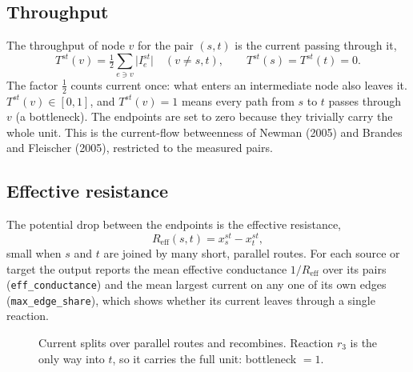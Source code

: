 \documentclass[11pt]{article}
\newcommand{\code}[1]{\texttt{#1}}
\newcommand{\Reff}{R_{\mathrm{eff}}}
\begin{document}
\subsection{Throughput}
The throughput of node $v$ for the pair $(s,t)$ is the current passing through it,
\begin{equation}
  T^{st}(v) = \tfrac12 \sum_{e\ni v} \bigl|I^{st}_e\bigr|
  \quad (v\neq s,t),
  \qquad T^{st}(s)=T^{st}(t)=0 .
  \label{eq:throughput}
\end{equation}
The factor $\tfrac12$ counts current once: what enters an intermediate node also
leaves it. $T^{st}(v)\in[0,1]$, and $T^{st}(v)=1$ means every path from $s$ to $t$
passes through $v$ (a bottleneck). The endpoints are set to zero because they
trivially carry the whole unit. This is the current-flow betweenness of
Newman (2005) and Brandes and Fleischer (2005), restricted to the measured pairs.

\subsection{Effective resistance}
The potential drop between the endpoints is the effective resistance,
\[
  \Reff(s,t) = x^{st}_s - x^{st}_t ,
\]
small when $s$ and $t$ are joined by many short, parallel routes. For each source
or target the output reports the mean effective conductance $1/\Reff$ over its pairs
(\code{eff\_conductance}) and the mean largest current on any one of its own edges
(\code{max\_edge\_share}), which shows whether its current leaves through a single
reaction.

\begin{figure}[ht]
\centering
{}
\caption{Current splits over parallel routes and recombines. Reaction $r_3$ is the
only way into $t$, so it carries the full unit: bottleneck $=1$.}
\label{fig:split}
\end{figure}
\end{document}
